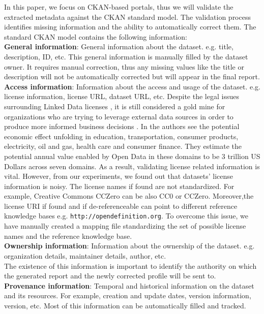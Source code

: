 \documentclass[runningheads,a4paper]{llncs}
\begin{document}
In this paper, we focus on CKAN-based portals, thus we will validate the extracted metadata against the CKAN standard model. The validation process identifies missing information and the ability to automatically correct them. The standard CKAN model contains the following information:\\
\textbf{General information}: General information about the dataset. e.g. title, description, ID, etc. This general information is manually filled by the dataset owner. It requires manual correction, thus any missing values like the title or description will not be automatically corrected but will appear in the final report.
\textbf{Access information}: Information about the access and usage of the dataset. e.g. license information, license URL, dataset URL, etc. Despite the legal issues surrounding Linked Data licenses \cite{nomoneyLOD}, it is still considered a gold mine for organizations who are trying to leverage external data sources in order to produce more informed business decisions \cite{Boyd2011}. In \cite{mckinseyreport} the authors see the potential economic effect unfolding in education, transportation, consumer products, electricity, oil and gas, health care and consumer finance. They estimate the potential annual value enabled by Open Data in these domains to be 3 trillion US Dollars across seven domains. As a result, validating license related information is vital. However, from our experiments, we found out that datasets' license information is noisy. The license names if found are not standardized. For example, Creative Commons CCZero can be also CC0 or CCZero. Moreover,the license URI if found and if de-referenceable can point to different reference knowledge bases e.g. \texttt{http://opendefinition.org}. To overcome this issue, we have manually created a mapping file standardizing the set of possible license names and the reference knowledge base.\\
\textbf{Ownership information}: Information about the ownership of the dataset. e.g. organization details, maintainer details, author, etc.\\ The existence of this information is important to identify the authority on which the generated report and the newly corrected profile will be sent to.\\
\textbf{Provenance information}: Temporal and historical information on the dataset and its resources. For example, creation and update dates, version information, version, etc. Most of this information can be automatically filled and tracked.\\
\end{document}
